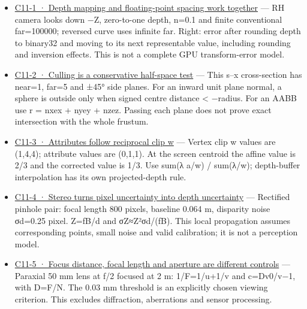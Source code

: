 \begin{itemize}
\item
  \href{Continuous\%20Notes/Computing\%20Foundations\%20-\%20From\%20Bits\%20to\%20C++\%20and\%20Systems\%20APIs\#Figure\%20C11-1\%20—\%20Depth\%20mapping\%20and\%20floating-point\%20spacing\%20work\%20together}{C11-1 · Depth mapping and floating-point spacing work together} --- RH camera looks down −Z, zero-to-one depth, n=0.1 and finite conventional far=100000; reversed curve uses infinite far. Right: error after rounding depth to binary32 and moving to its next representable value, including rounding and inversion effects. This is not a complete GPU transform-error model.
\item
  \href{Continuous\%20Notes/Computing\%20Foundations\%20-\%20From\%20Bits\%20to\%20C++\%20and\%20Systems\%20APIs\#Figure\%20C11-2\%20—\%20Culling\%20is\%20a\%20conservative\%20half-space\%20test}{C11-2 · Culling is a conservative half-space test} --- This s--x cross-section has near=1, far=5 and ±45° side planes. For an inward unit plane normal, a sphere is outside only when signed centre distance \textless{} −radius. For an AABB use r = \textbar nx\textbar ex + \textbar ny\textbar ey + \textbar nz\textbar ez. Passing each plane does not prove exact intersection with the whole frustum.
\item
  \href{Continuous\%20Notes/Computing\%20Foundations\%20-\%20From\%20Bits\%20to\%20C++\%20and\%20Systems\%20APIs\#Figure\%20C11-3\%20—\%20Attributes\%20follow\%20reciprocal\%20clip\%20w}{C11-3 · Attributes follow reciprocal clip w} --- Vertex clip w values are (1,4,4); attribute values are (0,1,1). At the screen centroid the affine value is 2/3 and the corrected value is 1/3. Use sum(λ a/w) / sum(λ/w); depth-buffer interpolation has its own projected-depth rule.
\item
  \href{Continuous\%20Notes/Computing\%20Foundations\%20-\%20From\%20Bits\%20to\%20C++\%20and\%20Systems\%20APIs\#Figure\%20C11-4\%20—\%20Stereo\%20turns\%20pixel\%20uncertainty\%20into\%20depth\%20uncertainty}{C11-4 · Stereo turns pixel uncertainty into depth uncertainty} --- Rectified pinhole pair: focal length 800 pixels, baseline 0.064 m, disparity noise σd=0.25 pixel. Z=fB/d and σZ≈Z²σd/(fB). This local propagation assumes corresponding points, small noise and valid calibration; it is not a perception model.
\item
  \href{Continuous\%20Notes/Computing\%20Foundations\%20-\%20From\%20Bits\%20to\%20C++\%20and\%20Systems\%20APIs\#Figure\%20C11-5\%20—\%20Focus\%20distance,\%20focal\%20length\%20and\%20aperture\%20are\%20different\%20controls}{C11-5 · Focus distance, focal length and aperture are different controls} --- Paraxial 50 mm lens at f/2 focused at 2 m: 1/F=1/u+1/v and c=D\textbar v0/v−1\textbar, with D=F/N. The 0.03 mm threshold is an explicitly chosen viewing criterion. This excludes diffraction, aberrations and sensor processing.

\end{itemize}
